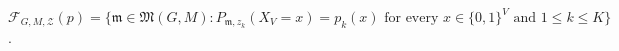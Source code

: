 \(\mathcal F_{G,M,\mathcal Z}(p)=\{\mathfrak m\in\mathfrak M(G,M):P_{\mathfrak m,z_k}(X_V=x)=p_k(x)\text{ for every }x\in\{0,1\}^{V}\text{ and }1\le k\le K\}\).